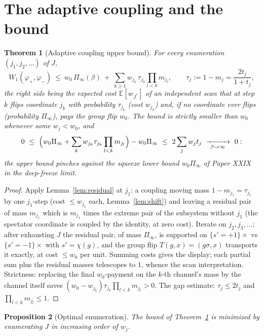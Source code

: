 \documentclass[11pt]{amsart}
\newtheorem{theorem}{Theorem}[section]
\newtheorem{proposition}[theorem]{Proposition}
\theoremstyle{remark}
\newcommand{\E}{\mathbb{E}}
\begin{document}
\section{The adaptive coupling and the bound}\label{sec:bound}

\begin{theorem}[Adaptive coupling upper bound]\label{thm:upper}
For every enumeration $(j_1,j_2,\dots)$ of $J$,
\[
W_1(\varphi_+,\varphi_-)\ \le\
w_0\,\Pi_\infty(\beta)\ +\ \sum_{k\ge1}w_{j_k}\,\tau_{j_k}\prod_{l<k}m_{j_l},
\qquad \tau_j:=1-m_j=\frac{2t_j}{1+t_j},
\]
the right side being the expected cost $\E[w_{J^*}]$ of an independent scan that at step
$k$ flips coordinate $j_k$ with probability $\tau_{j_k}$ (cost $w_{j_k}$) and, if no
coordinate ever flips (probability $\Pi_\infty$), pays the group flip $w_0$. The bound is
strictly smaller than $w_0$ whenever some $w_j<w_0$, and
\[
0\ \le\ \Bigl(w_0\Pi_\infty+\sum_kw_{j_k}\tau_{j_k}\prod_{l<k}m_{j_l}\Bigr)-w_0\Pi_\infty
\ \le\ 2\sum_jw_jt_j\ \xrightarrow[\ \beta\to\infty\ ]{}\ 0 :
\]
the upper bound pinches against the squeeze lower bound $w_0\Pi_\infty$ of Paper XXIX in
the deep-freeze limit.
\end{theorem}

\begin{proof}
Apply Lemma~\ref{lem:residual} at $j_1$: a coupling moving mass $1-m_{j_1}=\tau_{j_1}$ by
one $j_1$-step (cost $\le w_{j_1}$ each, Lemma~\ref{lem:shift}) and leaving a residual
pair of mass $m_{j_1}$ which is $m_{j_1}$ times the extreme pair of the subsystem without
$j_1$ (the spectator coordinate is coupled by the identity, at zero cost). Iterate on
$j_2,j_3,\dots$; after exhausting $J$ the residual pair, of mass $\Pi_\infty$, is
supported on $\{s'=+1\}\times$ vs $\{s'=-1\}\times$ with $s'=\chi(g)$, and the group flip
$T(g,x)=(g\sigma,x)$ transports it exactly, at cost $\le w_0$ per unit. Summing costs
gives the display; each partial sum plus the residual masses telescopes to $1$, whence
the scan interpretation. Strictness: replacing the final $w_0$-payment on the $k$-th
channel's mass by the channel itself saves $(w_0-w_{j_k})\tau_{j_k}\prod_{l<k}m_{j_l}>0$.
The gap estimate: $\tau_j\le2t_j$ and $\prod_{l<k}m_{j_l}\le1$.
\end{proof}

\begin{proposition}[Optimal enumeration]\label{prop:order}
The bound of Theorem~\ref{thm:upper} is minimized by enumerating $J$ in increasing order
of $w_j$.
\end{proposition}
\end{document}
